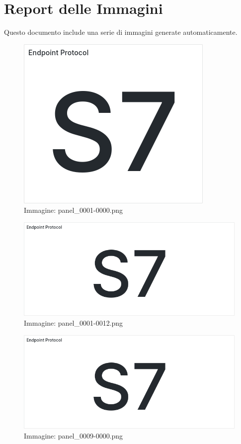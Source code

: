 \documentclass[a4paper,10pt]{article}
\begin{document}
\section*{Report delle Immagini}
Questo documento include una serie di immagini generate automaticamente.

\begin{figure}[h!]
    \centering
    \includegraphics[width=\textwidth]{panel_0001-0000.png}
    \caption{Immagine: panel\_0001-0000.png}
\end{figure}

\begin{figure}[h!]
    \centering
    \includegraphics[width=\textwidth]{panel_0001-0012.png}
    \caption{Immagine: panel\_0001-0012.png}
\end{figure}

\begin{figure}[h!]
    \centering
    \includegraphics[width=\textwidth]{panel_0009-0000.png}
    \caption{Immagine: panel\_0009-0000.png}
\end{figure}
\end{document}
